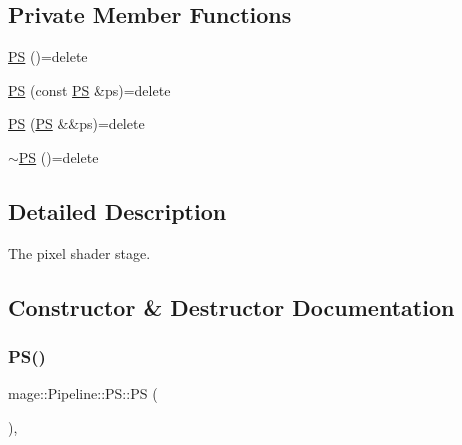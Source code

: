 \subsection*{Private Member Functions}
\begin{DoxyCompactItemize}
\item 
\hyperlink{structmage_1_1_pipeline_1_1_p_s_ac508116319ef82bed4abfd1b3a74f719}{PS} ()=delete
\item 
\hyperlink{structmage_1_1_pipeline_1_1_p_s_aa850fceb7c7b36dac625064bef178089}{PS} (const \hyperlink{structmage_1_1_pipeline_1_1_p_s}{PS} \&ps)=delete
\item 
\hyperlink{structmage_1_1_pipeline_1_1_p_s_a6213ebde43efb853d8080e92385fda07}{PS} (\hyperlink{structmage_1_1_pipeline_1_1_p_s}{PS} \&\&ps)=delete
\item 
\hyperlink{structmage_1_1_pipeline_1_1_p_s_abfbe6c37dc53641c4a0a2590c96ec1f0}{$\sim$\+PS} ()=delete
\end{DoxyCompactItemize}


\subsection{Detailed Description}
The pixel shader stage. 

\subsection{Constructor \& Destructor Documentation}
\hypertarget{structmage_1_1_pipeline_1_1_p_s_ac508116319ef82bed4abfd1b3a74f719}{}\label{structmage_1_1_pipeline_1_1_p_s_ac508116319ef82bed4abfd1b3a74f719} 
\subsubsection{\texorpdfstring{P\+S()}{PS()}\hspace{0.1cm}{\footnotesize\ttfamily [1/3]}}
{\footnotesize\ttfamily mage\+::\+Pipeline\+::\+P\+S\+::\+PS (\begin{DoxyParamCaption}{ }\end{DoxyParamCaption})\hspace{0.3cm}{\ttfamily [private]}, {\ttfamily [delete]}}

\hypertarget{structmage_1_1_pipeline_1_1_p_s_aa850fceb7c7b36dac625064bef178089}{}\label{structmage_1_1_pipeline_1_1_p_s_aa850fceb7c7b36dac625064bef178089} 
